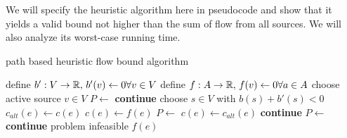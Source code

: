We will specify the heuristic algorithm here in pseudocode and show that it yields a valid bound not higher than the 
sum of flow from all sources. We will also analyze its worst-case running time.

\begin{algorithm}
 \caption{path based heuristic flow bound algorithm}
\label{algo:pathHeur}
 \begin{algorithmic}[5]%
    \State define $b':V\to \mathbb{R},\, b'(v)\gets 0 \forall v\in V$ 
    \State define $f: A\to\mathbb{R},\, f(v)\gets 0 \forall a\in A$
      \State choose active source $v\in V$ 
	\State $P\gets $
	  \State {}\label{heur:lineAugCase1}
	  \State \textbf{continue}
	\EndIf
      \EndIf
	\State choose $s\in V$ with $b(s)+b'(s)<0$
	\State $c_{alt}(e)\gets c(e)$
	\State $c(e)\gets f(e)$
	\State $P\gets$
	\State $c(e)\gets c_{alt}(e)$
	  \State {}\label{heur:lineAugCase2}
	  \State \textbf{continue}
	\Else
	  \State $P\gets$ 
	    \State {}\label{heur:lineAugCase3}
	    \State \textbf{continue}
	  \Else
	    \State \Return problem infeasible
	  \EndIf
	\EndIf
    \EndWhile
    \State \Return $f(e)$
  \EndFunction
 \end{algorithmic}

\end{algorithm}

